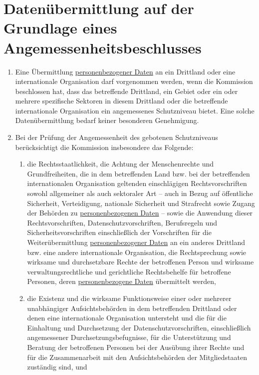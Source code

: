 \chapter{Datenübermittlung auf der Grundlage eines Angemessenheitsbeschlusses}
\label{ch:45}


\begin{enumerate}

  \item Eine Übermittlung \hyperref[itm:04-1]{personenbezogener Daten} an ein Drittland oder eine internationale Organisation darf
   vorgenommen werden, wenn die Kommission beschlossen hat, dass das betreffende Drittland, ein Gebiet oder ein oder
   mehrere spezifische Sektoren in diesem Drittland oder die betreffende internationale Organisation ein angemessenes
   Schutzniveau bietet. Eine solche Datenübermittlung bedarf keiner besonderen Genehmigung.
  \label{itm:45-1}

  \item Bei der Prüfung der Angemessenheit des gebotenen Schutzniveaus berücksichtigt die Kommission insbesondere das
   Folgende:
  \label{itm:45-2}

  \begin{enumerate}
  
    \item die Rechtsstaatlichkeit, die Achtung der Menschenrechte und Grundfreiheiten, die in dem betreffenden Land bzw.
     bei der betreffenden internationalen Organisation geltenden einschlägigen Rechtsvorschriften sowohl allgemeiner
     als auch sektoraler Art -- auch in Bezug auf öffentliche Sicherheit, Verteidigung, nationale Sicherheit und
     Strafrecht sowie Zugang der Behörden zu \hyperref[itm:04-1]{personenbezogenen Daten} -- sowie die Anwendung dieser Rechtsvorschriften,
     Datenschutzvorschriften, Berufsregeln und Sicherheitsvorschriften einschließlich der Vorschriften für die
     Weiterübermittlung \hyperref[itm:04-1]{personenbezogener Daten} an ein anderes Drittland bzw. eine andere internationale Organisation,
     die Rechtsprechung sowie wirksame und durchsetzbare Rechte der betroffenen Person und wirksame
     verwaltungsrechtliche und gerichtliche Rechtsbehelfe für betroffene Personen, deren \hyperref[itm:04-1]{personenbezogene Daten}
     übermittelt werden,
    \label{itm:45-2a}

    \item die Existenz und die wirksame Funktionsweise einer oder mehrerer unabhängiger Aufsichtsbehörden in dem
     betreffenden Drittland oder denen eine internationale Organisation untersteht und die für die Einhaltung und
     Durchsetzung der Datenschutzvorschriften, einschließlich angemessener Durchsetzungsbefugnisse, für die
     Unterstützung und Beratung der betroffenen Personen bei der Ausübung ihrer Rechte und für die Zusammenarbeit mit
     den Aufsichtsbehörden der Mitgliedstaaten zuständig sind, und
    \label{itm:45-2b}


\end{enumerate}
\end{enumerate}
